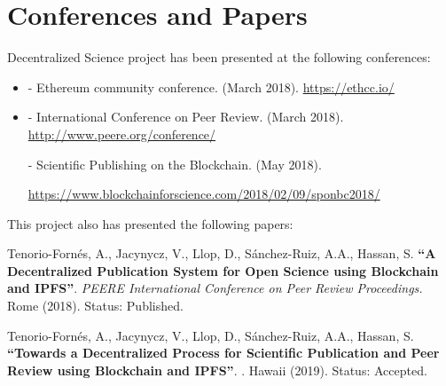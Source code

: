 \section{Conferences and Papers}
\label{sec:conferences-papers}

Decentralized Science project has been presented at the following conferences:

\begin{itemize}
\item {} - Ethereum community conference.  (March
  2018). \url{https://ethcc.io/}

\item {} - International Conference on Peer Review. 
  (March 2018). \url{http://www.peere.org/conference/}

   - Scientific Publishing on the Blockchain.  (May 2018).
  
  
  \url{https://www.blockchainforscience.com/2018/02/09/sponbc2018/}
\end{itemize}

This project also has presented the following papers:

Tenorio-Fornés, A., Jacynycz, V., Llop, D., Sánchez-Ruiz, A.A., Hassan, S.
\textbf{``A Decentralized Publication System for Open Science using Blockchain
  and IPFS''}. \emph{PEERE International Conference on Peer Review Proceedings.}
Rome (2018). Status: Published.

Tenorio-Fornés, A., Jacynycz, V., Llop, D., Sánchez-Ruiz, A.A., Hassan, S.
\textbf{``Towards a Decentralized Process for Scientific Publication and Peer
  Review using Blockchain and IPFS''}. . Hawaii (2019). Status: Accepted.



\cleardoublepage



\clearpage



